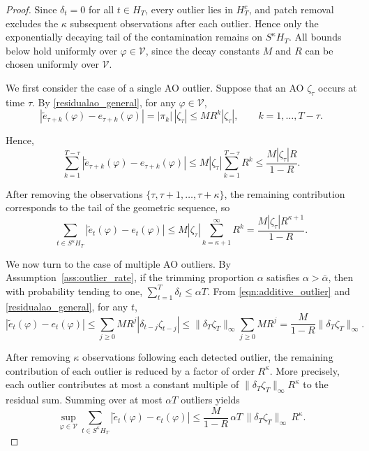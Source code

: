 \documentclass[10pt,a4paper]{amsart}
\begin{document}
\begin{proof}
Since $\delta_t=0$ for all $t\in H_T$, every outlier lies in $H_T^c$, and patch removal excludes the $\kappa$ subsequent observations after each outlier. Hence only the exponentially decaying tail of the contamination remains on $S^\kappa H_T$.
All bounds below hold uniformly over $\varphi \in \mathcal V$, since the decay constants $M$ and $R$ can be chosen uniformly over $\mathcal V$.

We first consider the case of a single AO outlier. Suppose that an AO $\zeta_\tau$ occurs at time $\tau$. By \eqref{residualao_general}, for any $\varphi \in \mathcal V$,
\begin{equation}
\left| \tilde{e}_{\tau+k}(\varphi)-e_{\tau+k}(\varphi)\right|
=
|\pi_k|\,|\zeta_\tau|
\le
M R^k |\zeta_\tau|,
\qquad k=1,\ldots,T-\tau.
\end{equation}

Hence,
\begin{equation}
\sum_{k=1}^{T-\tau}
\left| \tilde{e}_{\tau+k}(\varphi)-e_{\tau+k}(\varphi)\right|
\le
M |\zeta_\tau| \sum_{k=1}^{T-\tau} R^k
\le
\frac{M |\zeta_\tau| R}{1-R}.
\end{equation}

After removing the observations $\{\tau,\tau+1,\ldots,\tau+\kappa\}$, the remaining contribution corresponds to the tail of the geometric sequence, so
\begin{equation}
\sum_{t \in S^\kappa H_T}
\left| \tilde{e}_t(\varphi)-e_t(\varphi)\right|
\le
M |\zeta_\tau| \sum_{k=\kappa+1}^{\infty} R^k
=
\frac{M |\zeta_\tau| R^{\kappa+1}}{1-R}.
\end{equation}

We now turn to the case of multiple AO outliers.
By Assumption~\ref{ass:outlier_rate}, if the trimming proportion $\alpha$ satisfies $\alpha>\bar\alpha$, then with probability tending to one,
$\sum_{t=1}^T \delta_t \le \alpha T$.
From \eqref{eqn:additive_outlier} and \eqref{residualao_general}, for any $t$,
\begin{equation}
\left| \tilde{e}_t(\varphi)-e_t(\varphi)\right|
\le
\sum_{j\ge 0} M R^j |\delta_{t-j}\zeta_{t-j}|
\le
\|\delta_T\zeta_T\|_\infty \sum_{j\ge 0} M R^j
=
\frac{M}{1-R}\|\delta_T\zeta_T\|_\infty.
\end{equation}

After removing $\kappa$ observations following each detected outlier, the remaining contribution of each outlier is reduced by a factor of order $R^\kappa$. More precisely, each outlier contributes at most a constant multiple of $\|\delta_T \zeta_T\|_\infty R^\kappa$ to the residual sum. Summing over at most $\alpha T$ outliers yields
\begin{equation}
\sup_{\varphi \in \mathcal V}
\sum_{t \in S^\kappa H_T}
\left| \tilde{e}_t(\varphi)-e_t(\varphi)\right|
\le
\frac{M}{1-R}\,\alpha T\,\|\delta_T\zeta_T\|_\infty\,R^\kappa.
\end{equation}


\end{proof}
\end{document}
